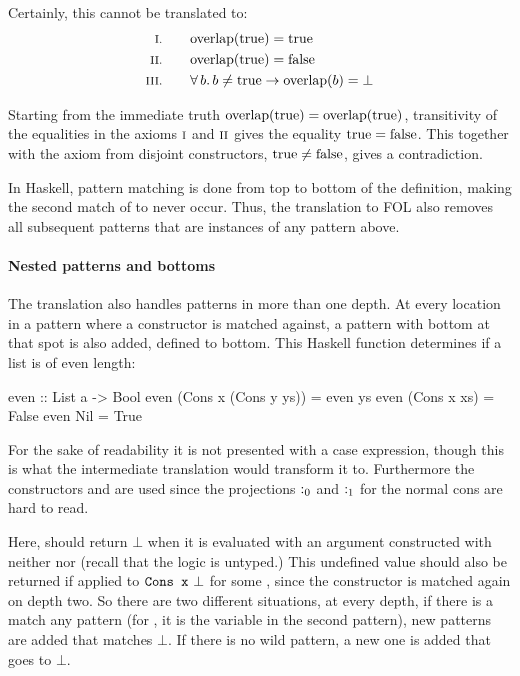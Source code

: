 Certainly, this cannot be translated to:
\begin{align*}
\rom{1} \qquad & \fn{overlap}(\fn{true}) = \fn{true} \\
\rom{2} \qquad & \fn{overlap}(\fn{true}) = \fn{false} \\
\rom{3} \qquad & \fa{b} b \neq \fn{true} \rightarrow \fn{overlap}(b) = \bot
\end{align*}

Starting from the immediate truth $\mathrm{overlap}(\mathrm{true}) =
\mathrm{overlap}(\mathrm{true})$, transitivity of the equalities in the axioms
$\romnodot{1}$ and $\romnodot{2}$ gives the equality $\mathrm{true} =
\mathrm{false}$. This together with the axiom from disjoint constructors,
$\mathrm{true} \neq \mathrm{false}$, gives a contradiction.

In Haskell, pattern matching is done from top to bottom of the
definition, making the second match of  to never occur. Thus,
the translation to FOL also removes all subsequent patterns that are
instances of any pattern above.



\paragraph{Nested patterns and bottoms} The translation also handles
patterns in more than one depth. At every location in a pattern where
a constructor is matched against, a pattern with bottom at that spot
is also added, defined to bottom. This Haskell function 
determines if a list is of even length:

\begin{code}
even :: List a -> Bool
even (Cons x (Cons y ys)) = even ys
even (Cons x xs)          = False
even Nil                  = True
\end{code}

\noindent
For the sake of readability it is not presented with a case
expression, though this is what the intermediate translation would
transform it to. Furthermore the constructors  and 
are used since the projections $\mathrm{:_0}$ and $\mathrm{:_1}$ for the
normal cons are hard to read.

Here,  should return $\bot$ when it is evaluated with an
argument constructed with neither  nor  (recall that
the logic is untyped.) This undefined value should also be returned if
applied to $\hs{Cons x\w}\bot$ for some , since the 
constructor is matched again on depth two. So there are two different
situations, at every depth, if there is a match any pattern (for
, it is the variable  in the second pattern), new
patterns are added that matches $\bot$. If there is no wild pattern, a
new one is added that goes to $\bot$.

